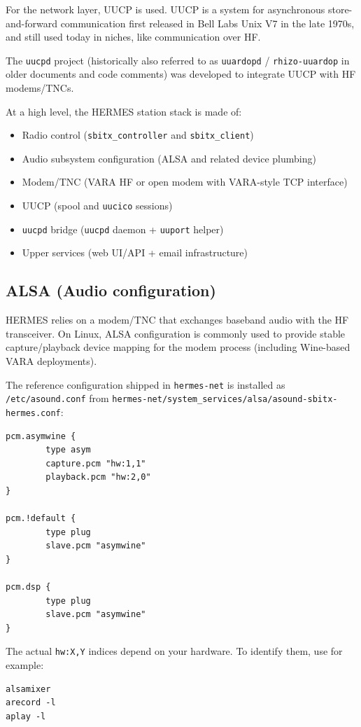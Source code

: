 For the network layer, UUCP is used. UUCP is a system for asynchronous
store-and-forward communication first released in Bell Labs Unix V7 in
the late 1970s, and still used today in niches, like communication over HF.

The \verb|uucpd| project (historically also referred to as \verb|uuardopd| / \verb|rhizo-uuardop| in older documents and code comments)
was developed to integrate UUCP with HF modems/TNCs.

At a high level, the HERMES station stack is made of:
\begin{itemize}
\item Radio control (\verb|sbitx_controller| and \verb|sbitx_client|)
\item Audio subsystem configuration (ALSA and related device plumbing)
\item Modem/TNC (VARA HF or open modem with VARA-style TCP interface)
\item UUCP (spool and \verb|uucico| sessions)
\item \verb|uucpd| bridge (\verb|uucpd| daemon + \verb|uuport| helper)
\item Upper services (web UI/API + email infrastructure)
\end{itemize}

\subsection{ALSA (Audio configuration)}

HERMES relies on a modem/TNC that exchanges baseband audio with the HF transceiver. On Linux, ALSA configuration is commonly used
to provide stable capture/playback device mapping for the modem process (including Wine-based VARA deployments).

The reference configuration shipped in \verb|hermes-net| is installed as \verb|/etc/asound.conf| from
\verb|hermes-net/system_services/alsa/asound-sbitx-hermes.conf|:
\begin{verbatim}
pcm.asymwine {
        type asym
        capture.pcm "hw:1,1"
        playback.pcm "hw:2,0"
}

pcm.!default {
        type plug
        slave.pcm "asymwine"
}

pcm.dsp {
        type plug
        slave.pcm "asymwine"
}
\end{verbatim}

The actual \verb|hw:X,Y| indices depend on your hardware. To identify them, use for example:
\begin{verbatim}
alsamixer
arecord -l
aplay -l
\end{verbatim}

